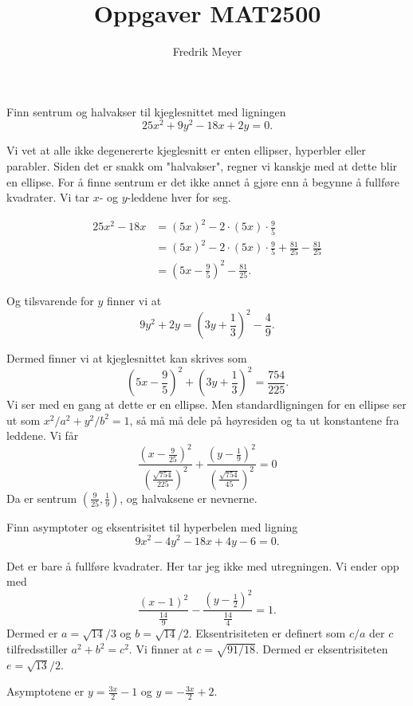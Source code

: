 \documentclass[11pt, norsk]{article}
\begin{document}
\title{Oppgaver MAT2500}
\author{Fredrik Meyer}
\maketitle 

\begin{oppg}
Finn sentrum og halvakser til kjeglesnittet med ligningen $$25x^2+ 9y^2-18x+2y=0.$$
\end{oppg}
\begin{losn}
Vi vet at alle ikke degenererte kjeglesnitt er enten ellipser, hyperbler eller parabler. Siden det er snakk om "halvakser", regner vi kanskje med at dette blir en ellipse. For å finne sentrum er det ikke annet å gjøre enn å begynne å fullføre kvadrater. Vi tar $x$- og $y$-leddene hver for seg.

\begin{align*}
25x^2-18x &= (5x)^2-2 \cdot (5x) \cdot \frac{9}{5} \\
&= (5x)^2 - 2 \cdot (5x) \cdot \frac 95 + \frac{81}{25} - \frac{81}{25} \\
&= (5x - \frac 95)^2 - \frac{81}{25}.
\end{align*}

Og tilsvarende for $y$ finner vi at
$$
9y^2+2y = (3y+\frac 13)^2- \frac 49.
$$

Dermed finner vi at kjeglesnittet kan skrives som 
$$
(5x-\frac 95)^2 + (3y + \frac 13)^2 = \frac{754}{225}.
$$
Vi ser med en gang at dette er en ellipse. Men standardligningen for en ellipse ser ut som $x^2/a^2+y^2/b^2=1$, så må må dele på høyresiden og ta ut konstantene fra leddene. Vi får 
$$
\frac{\left(x-\frac{9}{25}\right)^2}{\left(\frac{\sqrt{754}}{225}\right)^2} + 
\frac{\left(y-\frac{1}{9}\right)^2}{\left(\frac{\sqrt{754}}{45}\right)^2} = 0
$$
Da er sentrum $(\frac 9{25},\frac 19)$, og halvaksene er nevnerne.
\end{losn}

\begin{oppg}
Finn asymptoter og eksentrisitet til hyperbelen med ligning
$$
9x^2-4y^2-18x+4y-6=0.
$$
\end{oppg}
\begin{losn}
Det er bare å fullføre kvadrater. Her tar jeg ikke med utregningen. Vi ender opp med 
$$
\frac{\left(x-1\right)^2}{\frac {14}9} - \frac{\left(y-\frac 12\right)^2}{\frac{14}{4}} = 1.
$$
Dermed er $a= \sqrt{14}/3$ og $b=\sqrt{14}/2$. Eksentrisiteten er definert som $c/a$ der $c$ tilfredsstiller $a^2+b^2=c^2$. Vi finner at $c=\sqrt{91/18}$. Dermed er eksentrisiteten $e=\sqrt{13}/2$.

Asymptotene er $y=\frac {3x}2 -1$ og $y = -\frac{3x}{2} +2$.
\end{losn}
\end{document}

